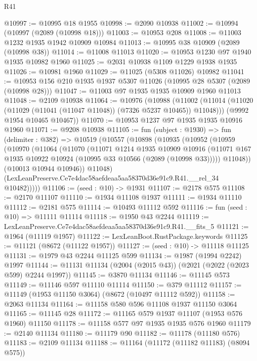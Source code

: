 \begin{lexlean}{R41}
\begin{coremodule}
@10997 := @10995 @18 @1955
@10998 := @2090 @10938
@11002 := @10994 (@10997 (@2089 (@10998 @18)))
@11003 := @10953 @208
@11008 := @11003 @1232 @1935 @1942 @10909 @10984
@11013 := @10995 @38 @10909 (@2089 (@10998 @38))
@11014 := @11008 @11013
@11020 := @10953 @1230 @97 @1940 @1935 @10982 @1960
@11025 := @2031 @10938 @1109 @1229 @1938 @1935
@11026 := @10981 @1960
@11029 := @11025 (@5308 @11026) @10982
@11041 := @10953 @156 @210 @1935 @1937 @5307 @11026 (@10995 @28 @5307 (@2089 (@10998 @28)))
@11047 := @11003 @97 @1935 @1935 @10909 @1960 @11013
@11048 := @2109 @10938
@11064 := @10976
    (@10988
      (@11002 (@11014 (@11020 (@11029 (@11041 (@11047 @11048)) (@7326 @5237 @10465)) @11048)))
      (@9992 @1954 @10465 @10467))
@11070 := @10953 @1237 @97 @1935 @1935 @10916 @1960
@11071 := @9208 @10938
@11105 := fun (subject : @1930) =>
  fun (delimiter : @382) =>
  @10519
    (@10557
      (@10898
        (@10935
          (@10952
            (@10959
              (@10970
                (@11064
                  (@11070
                    (@11071
                      @1214
                      @1935
                      @10909
                      @10916
                      (@11071 @167 @1935 @10922 @10924 (@10995 @33 @10566 (@2089 (@10998 @33)))))
                    @11048))
                (@10013 @10944 @10946))
              @11048)
            (LexLeanPreserve.Ce7e4dac58aefdeaa5aa58370d36e91c9.R41.__rel_34 @10482)))))
@11106 := (seed : @10) -> @1931
@11107 := @2178 @575
@11108 := @2170 @11107
@11110 := @1934 @11108 @1937
@11111 := @1934 @11110
@11112 := @2181 @575
@11114 := @10493 @11112 @592
@11116 := fun (seed : @10) => @11111 @11114
@11118 := @1950 @43 @2244
@11119 := LexLeanPreserve.Ce7e4dac58aefdeaa5aa58370d36e91c9.R41.__fits_5
@11121 := @1964 (@11119 @1957)
@11122 := LexLeanBoot.RustPackage.keywords
@11125 := @11121 (@8672 (@11122 @1957))
@11127 := (seed : @10) -> @11118 @11125
@11131 := @1979 @43 @2244 @11125 @599
@11134 := @1987 (@1994 @2242) @1997
@11144 := @11131 @11134 (@2004 (@2015 @43)) (@2021 (@2022 (@2023 @599) @2244 @1997))
@11145 := @3870 @11134
@11146 := @11145 @573
@11149 := @11146 @597 @11110 @11114
@11150 := @379 @11112
@11157 := @11149 (@1953 @11150 @3064) (@8672 (@10497 @11112 @592))
@11158 := @2063 @11134
@11164 := @11158 @580 @596 @11108 @1937 @11150 @3064
@11165 := @11145 @28
@11172 := @11165 @579 @1937 @11107 (@1953 @576 @1960) @11150
@11178 := @11158 @577 @97 @1935 @1935 @576 @1960
@11179 := @2140 @11134
@11180 := @11179 @90
@11182 := @11178 (@11180 @576)
@11183 := @2109 @11134
@11188 := @11164 (@11172 (@11182 @11183) (@8094 @575))

\end{coremodule}
\end{lexlean}
